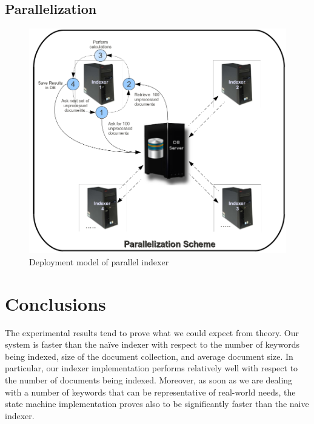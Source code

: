 \documentclass[10pt]{report}
\begin{document}
\subsection{Parallelization}
\label{parallelization}

\begin{figure}[p]
  \begin{center}
    \includegraphics[width=\textwidth,height=!]{paralleldeploymentmodel}
  \end{center}
  \caption{Deployment model of parallel indexer} 
  \label{fig:paralleldeploymentmodel}
\end{figure} 


\section{Conclusions}
\label{sec:conclusions}
The experimental results tend to prove what we could expect from
theory. Our system is faster than the na\"{i}ve indexer with respect
to the number of keywords being indexed, size of the document
collection, and average document size. In particular, our indexer
implementation performs relatively well with respect to the number of
documents being indexed. Moreover, as soon as we are dealing with a number of
keywords that can be representative of real-world needs, the state
machine implementation proves also to be significantly faster than the
naive indexer. 
\end{document}
